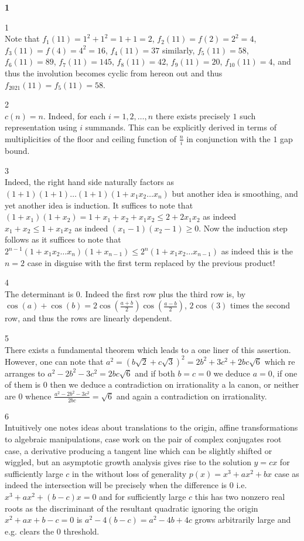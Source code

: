 \Large

\textbf{1}

1 \\
Note that $f_1 (11)=1^2+1^2=1+1=2$, $f_2 (11)=f(2)=2^2=4$, $f_3 (11)=f(4)=4^2=16$, $f_4 (11)=37$ similarly, $f_5 (11)=58$, $f_6 (11)=89$, $f_7 (11)=145$, $f_8 (11)=42$, $f_9 (11)=20$, $f_{10} (11)=4$, and thus the involution becomes cyclic from hereon out and thus $f_{2021} (11) = f_{5} (11)=\boxed{58}$.

2 \\
$\boxed{c(n)=n}$. Indeed, for each $i=1,2,\dots,n$ there exists precisely $1$ such representation using $i$ summands. This can be explicitly derived in terms of multiplicities of the floor and ceiling function of $\frac{n}{i}$ in conjunction with the $1$ gap bound.

3 \\
Indeed, the right hand side naturally factors as $(1+1)(1+1)\dots(1+1)(1+x_1x_2\dots x_n)$ but another idea is smoothing, and yet another idea is induction. It suffices to note that $(1+x_1)(1+x_2)=1+x_1+x_2+x_1x_2 \le 2+2 x_1 x_2$ as indeed $x_1+x_2 \le 1+x_1 x_2$ as indeed $(x_1-1)(x_2-1)\ge 0$. Now the induction step follows as it suffices to note that $2^{n-1}(1+x_1x_2\dots x_n)(1+x_{n-1}) \le 2^n (1+x_1x_2\dots x_{n-1})$ as indeed this is the $n=2$ case in disguise with the first term replaced by the previous product!

4 \\
The determinant is $\boxed{0}$. Indeed the first row plus the third row is, by $\cos(a)+\cos(b) = 2\cos \left(\frac{a+b}{2} \right) \cos \left(\frac{a-b}{2} \right)$, $2\cos(3)$ times the second row, and thus the rows are linearly dependent.

5 \\
There exists a fundamental theorem which leads to a one liner of this assertion. However, one can note that $a^2=(b\sqrt{2}+c\sqrt{3})^2=2b^2+3c^2+2bc\sqrt{6}$ which re arranges to $a^2-2b^2-3c^2 = 2bc\sqrt{6}$ and if both $b=c=0$ we deduce $a=0$, if one of them is $0$ then we deduce a contradiction on irrationality a la canon, or neither are $0$ whence $\frac{a^2-2b^2-3c^2}{2bc} = \sqrt{6}$ and again a contradiction on irrationality.

6 \\
Intuitively one notes ideas about translations to the origin, affine transformations to algebraic manipulations, case work on the pair of complex conjugates root case, a derivative producing a tangent line which can be slightly shifted or wiggled, but an asymptotic growth analysis gives rise to the solution $y=cx$ for sufficiently large $c$ in the without loss of generality $p(x)=x^3+ax^2+bx$ case as indeed the intersection will be precisely when the difference is $0$ i.e. $x^3+ax^2+(b-c)x=0$ and for sufficiently large $c$ this has two nonzero real roots as the discriminant of the resultant quadratic ignoring the origin $x^2+ax+b-c=0$ is $a^2-4(b-c)=a^2-4b+4c$ grows arbitrarily large and e.g. clears the $0$ threshold.

